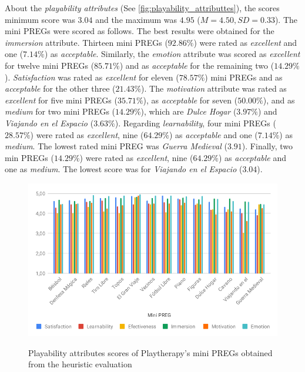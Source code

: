 About the \textit{playability attributes} (See \autoref{fig:playability_attributtes}), the scores minimum score was $3.04$ and the maximum was $4.95$ ($M = 4.50, SD = 0.33$). The mini \acp{PREG} were scored as follows. The best results were obtained for the \textit{immersion} attribute. Thirteen mini \acp{PREG} ($92.86\%$) were rated as \textit{excellent} and one ($7.14\%$) as \textit{acceptable}. Similarly, the \textit{emotion} attribute was scored as \textit{excellent} for twelve mini \acp{PREG} ($85.71\%$) and as \textit{acceptable} for the remaining two ($14.29\%$). \textit{Satisfaction} was rated as \textit{excellent} for eleven ($78.57\%$) mini \acp{PREG} and as \textit{acceptable} for the other three ($21.43\%$). The \textit{motivation} attribute was rated as \textit{excellent} for five mini \acp{PREG} ($35.71\%$), as \textit{acceptable} for seven ($50.00\%$), and as \textit{medium} for two mini \acp{PREG} ($14.29\%$), which are \textit{Dulce Hogar} ($3.97\%$) and \textit{Viajando en el Espacio} ($3.63\%$). Regarding \textit{learnability}, four mini \acp{PREG} ($28.57\%$) were rated as \textit{excellent}, nine ($64.29\%$) as \textit{acceptable} and one ($7.14\%$) as \textit{medium}. The lowest rated mini \ac{PREG} was \textit{Guerra Medieval} ($3.91$). Finally, two min \acp{PREG} ($14.29\%$) were rated as \textit{excellent}, nine ($64.29\%$) as \textit{acceptable} and one as \textit{medium}. The lowest score was for \textit{Viajando en el Espacio} ($3.04$).

\begin{figure}[bth]
\myfloatalign
{\includegraphics[width=\linewidth]{gfx/playtherapy/playability_attributtes}} \quad
\caption{Playability attributes scores of Playtherapy's mini \acp{PREG} obtained from the heuristic evaluation}
\label{fig:playability_attributtes}
\end{figure}

